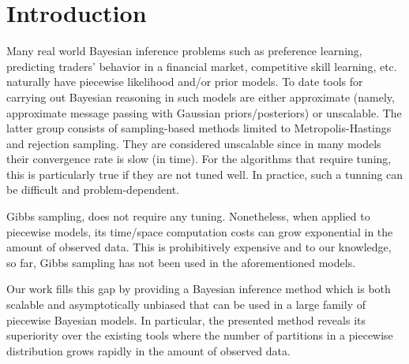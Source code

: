 \section{Introduction}

Many real world Bayesian inference problems such as preference
learning, predicting traders’ behavior in a financial market,
competitive skill learning, etc. naturally have piecewise likelihood
and/or prior models. To date tools for carrying out Bayesian reasoning
in such models are either approximate (namely, approximate message
passing with Gaussian priors/posteriors) or unscalable. The latter
group consists of sampling-based methods limited to
Metropolis-Hastings and rejection sampling. They are considered
unscalable since in many models their convergence rate is slow (in
time).  For the algorithms that require tuning, this is particularly
true if they are not tuned well.  In practice, such a tunning can be
difficult and problem-dependent.

Gibbs sampling, does not require any tuning.  Nonetheless, when
applied to piecewise models, its time/space computation costs can grow
exponential in the amount of observed data.  This is prohibitively
expensive and to our knowledge, so far, Gibbs sampling has not been
used in the aforementioned models.

Our work fills this gap by providing a Bayesian inference method which
is both scalable and asymptotically unbiased that can be used in a
large family of piecewise Bayesian models.  In particular, the
presented method reveals its superiority over the existing tools where
the number of partitions in a piecewise distribution grows rapidly in
the amount of observed data.

